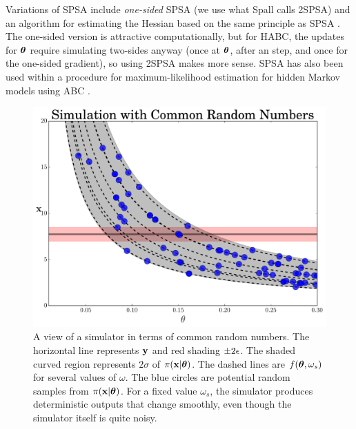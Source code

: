 \documentclass[]{article}
\begin{document}
Variations of SPSA include {\em one-sided} SPSA \cite{spall2000adaptive} (we use what Spall calls 2SPSA) and an algorithm for estimating the Hessian based on the same principle as SPSA \cite{spall2005monte}.   The one-sided version is attractive computationally, but for HABC, the updates for ${\bm \theta}$ require simulating two-sides anyway (once at ${\bm \theta}$, after an step, and once for the one-sided gradient), so using 2SPSA makes more sense.  SPSA has also been used within a procedure for maximum-likelihood estimation for hidden Markov models using ABC \cite{Ehrlich2013}.

\begin{figure}[t]
\vskip 0.2in
\begin{center}
\includegraphics[width=0.75\columnwidth]{./images/exp_crn_figure.pdf}
\vspace{-0.1in}
\caption{\small{A view of a simulator in terms of common random numbers.  The horizontal line represents ${\bf y}$ and red shading $\pm 2\epsilon$.  The shaded curved region represents $2\sigma$ of $\pi({\bf x}|{\bm \theta})$.  The dashed lines are $f({\bm \theta}, \omega_s)$ for several values of $\omega$.  The blue circles are potential random samples from $\pi({\bf x}|{\bm \theta})$.  For a fixed value $\omega_s$, the simulator produces deterministic outputs that change smoothly, even though the simulator itself is quite noisy.}}
\label{fig:exp-crns}
\end{center}
\vspace{-0.2in}
\end{figure} 
\end{document}
